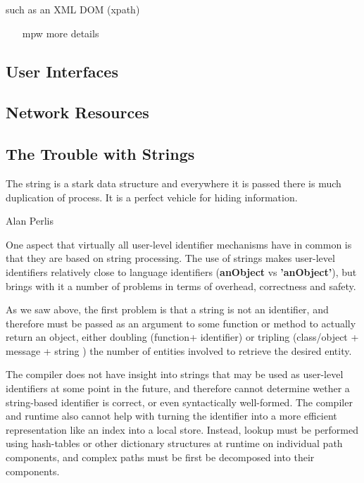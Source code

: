 \documentclass[preprint,authoryear]{acm_proc_article-sp}
\begin{document}
 such as an XML DOM (xpath)

\begin{itemize}
\item [mpw] more details
\end{itemize}

\subsection{User Interfaces}




\subsection{Network Resources}



\subsection{The Trouble with Strings}

\epigraph{The string is a stark data structure and everywhere it is passed there is much duplication of process. It is a perfect vehicle for hiding information.}{Alan Perlis}


One aspect that virtually all user-level identifier mechanisms have in common is that they
are based on string processing.  The use of strings makes user-level identifiers relatively
close to language identifiers ({\bf \hbox{anObject}} vs {\bf \hbox{'anObject'}}), but brings with it a number of problems in terms of overhead, correctness and safety.

As we saw above, the first problem is that a string is not an identifier, and therefore
must be passed as an argument to some function or method to actually return
 an object, either doubling (function+
identifier) or tripling (class/object + message + string ) the number of entities involved to 
retrieve the desired entity.  

The compiler does not have insight into strings that may be used as user-level 
identifiers at some point in the future, and therefore cannot determine wether 
a string-based identifier is correct, or even syntactically well-formed.   The compiler
and runtime also cannot help with turning the identifier into a more efficient representation
like an index into a local store.  Instead, lookup must be performed using hash-tables
or other dictionary structures at runtime on individual path components, 
and complex paths must be first be decomposed into their components.
\end{document}
